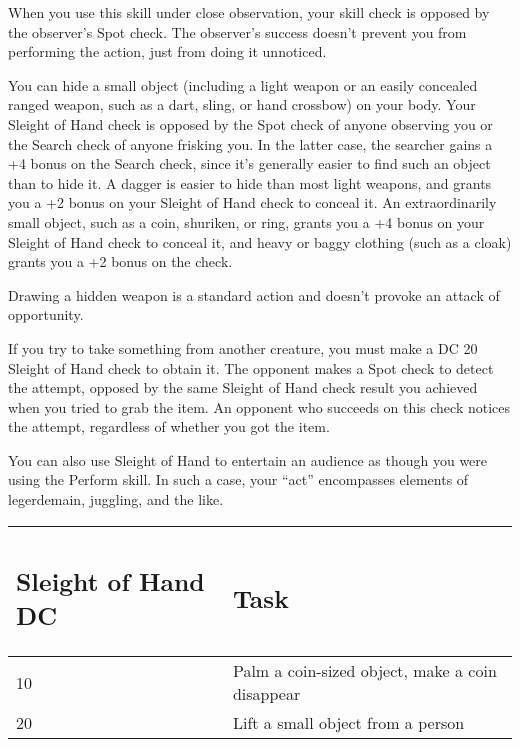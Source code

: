 \documentclass{article}
\begin{document}
When you use this skill under close observation, your skill check is opposed by 
the observer's Spot check. The observer's success doesn't prevent you from performing 
the action, just from doing it unnoticed.

You can hide a small object (including a light weapon or an easily concealed ranged 
weapon, such as a dart, sling, or hand crossbow) on your body. Your Sleight of 
Hand check is opposed by the Spot check of anyone observing you or the Search check 
of anyone frisking you. In the latter case, the searcher gains a +4 bonus on the 
Search check, since it's generally easier to find such an object than to hide it. 
A dagger is easier to hide than most light weapons, and grants you a +2 bonus on 
your Sleight of Hand check to conceal it. An extraordinarily small object, such 
as a coin, shuriken, or ring, grants you a +4 bonus on your Sleight of Hand check 
to conceal it, and heavy or baggy clothing (such as a cloak) grants you a +2 bonus 
on the check.

Drawing a hidden weapon is a standard action and doesn't provoke an attack of opportunity.

If you try to take something from another creature, you must make a DC 20 Sleight 
of Hand check to obtain it. The opponent makes a Spot check to detect the attempt, 
opposed by the same Sleight of Hand check result you achieved when you tried to 
grab the item. An opponent who succeeds on this check notices the attempt, regardless 
of whether you got the item.

You can also use Sleight of Hand to entertain an audience as though you were using 
the Perform skill. In such a case, your ``act'' encompasses elements of legerdemain, 
juggling, and the like.

\vspace{12pt}
\begin{tabular}{|>{\raggedright}p{82pt}|>{\raggedright}p{190pt}|}
\hline
\subsection*{S\textbf{leight of Hand DC }} & \subsection*{T\textbf{ask}}\tabularnewline
\hline
10 & Palm a coin-sized object, make a coin disappear\tabularnewline
\hline
20 & Lift a small object from a person\tabularnewline
\hline
\end{tabular}
\end{document}
